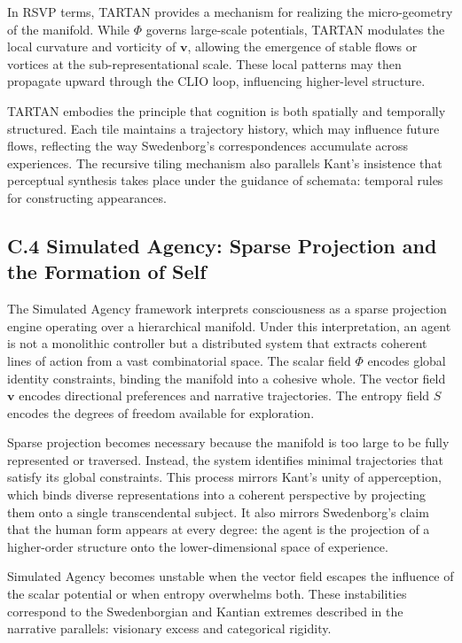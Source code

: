 \documentclass[12pt]{article}
\begin{document}
In RSVP terms, TARTAN provides a mechanism for realizing the micro-geometry of 
the manifold. While $\Phi$ governs large-scale potentials, TARTAN modulates the 
local curvature and vorticity of $\mathbf{v}$, allowing the emergence of stable 
flows or vortices at the sub-representational scale. These local patterns may 
then propagate upward through the CLIO loop, influencing higher-level 
structure.

TARTAN embodies the principle that cognition is both spatially and temporally 
structured. Each tile maintains a trajectory history, which may influence 
future flows, reflecting the way Swedenborg's correspondences accumulate across 
experiences. The recursive tiling mechanism also parallels Kant’s insistence 
that perceptual synthesis takes place under the guidance of schemata: temporal 
rules for constructing appearances.

\subsection*{C.4 Simulated Agency: Sparse Projection and the Formation of Self}

The Simulated Agency framework interprets consciousness as a sparse projection 
engine operating over a hierarchical manifold. Under this interpretation, an 
agent is not a monolithic controller but a distributed system that extracts 
coherent lines of action from a vast combinatorial space. The scalar field 
$\Phi$ encodes global identity constraints, binding the manifold into a 
cohesive whole. The vector field $\mathbf{v}$ encodes directional preferences 
and narrative trajectories. The entropy field $S$ encodes the degrees of 
freedom available for exploration.

Sparse projection becomes necessary because the manifold is too large to be 
fully represented or traversed. Instead, the system identifies minimal 
trajectories that satisfy its global constraints. This process mirrors Kant’s 
unity of apperception, which binds diverse representations into a coherent 
perspective by projecting them onto a single transcendental subject. It also 
mirrors Swedenborg’s claim that the human form appears at every degree: the 
agent is the projection of a higher-order structure onto the lower-dimensional 
space of experience.

Simulated Agency becomes unstable when the vector field escapes the influence 
of the scalar potential or when entropy overwhelms both. These instabilities 
correspond to the Swedenborgian and Kantian extremes described in the 
narrative parallels: visionary excess and categorical rigidity.
\end{document}
